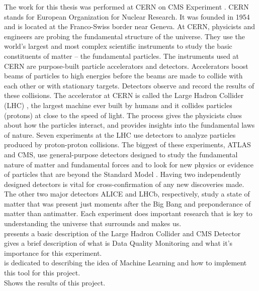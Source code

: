 
The work for this thesis was performed at CERN \cite{What_is_CERN} on CMS Experiment \cite{What_is_CMS}. CERN stands for European Organization for Nuclear Research. 
It was founded in 1954 and is located at the Franco-Swiss border near Geneva. At CERN, physicists and engineers are probing the fundamental structure of the universe. They use the world's largest and most complex scientific instruments to study the basic constituents of matter – the fundamental particles. The instruments used at CERN are purpose-built particle accelerators and detectors. Accelerators boost beams of particles to high energies before the beams are made to collide with each other or with stationary targets. Detectors observe and record the results of these collisions. The accelerator at CERN is called the Large Hadron Collider (LHC) \cite{What_is_LHC}, the largest machine ever built by humans and it collides particles (protons) at close to the speed of light. The process gives the physicists clues about how the particles interact, and provides insights into the fundamental laws of nature. Seven experiments at the LHC use detectors to analyze particles produced by proton-proton collisions. The biggest of these experiments, ATLAS\cite{What_is_ATLAS} and CMS, use general-purpose detectors designed to study the fundamental nature of matter and fundamental forces and to look for new physics or evidence of particles that are beyond the Standard Model \cite{What_is_SM} . Having two independently designed detectors is vital for cross-confirmation of any new discoveries made. The other two major detectors ALICE\cite{What_is_ALICE} and LHCb\cite{What_is_LHCb}, respectively, study a state of matter that was present just moments after the Big Bang and preponderance of matter than antimatter.  Each experiment does important research that is key to understanding the universe that surrounds and makes us.\\

 presents a basic description of the Large Hadron Collider and CMS Detector\\

 gives a brief description of what is Data Quality Monitoring and what it's importance for this experiment. \\

 is dedicated to describing the idea of Machine Learning and how to implement this tool for this project.\\

 Shows the results of this project.\\
